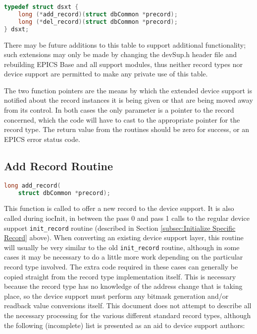 \begin{lstlisting}[language=C]
typedef struct dsxt {
    long (*add_record)(struct dbCommon *precord);
    long (*del_record)(struct dbCommon *precord);
} dsxt;
\end{lstlisting}

There may be future additions to this table to support additional functionality; such extensions may only be made by changing the devSup.h header file and rebuilding EPICS Base and all support modules, thus neither record types nor device support are permitted to make any private use of this table.

The two function pointers are the means by which the extended device support is notified about the record instances it is being given or that are being moved away from its control.
In both cases the only parameter is a pointer to the record concerned, which the code will have to cast to the appropriate pointer for the record type.
The return value from the routines should be zero for success, or an EPICS error status code.

\subsection{Add Record Routine}

\begin{lstlisting}[language=C]
long add_record(
    struct dbCommon *precord);
\end{lstlisting}

This function is called to offer a new record to the device support.
It is also called during iocInit, in between the pass 0 and pass 1 calls to the regular device support \verb|init_record| routine (described in Section \ref{subsec:Initialize Specific Record} above).
When converting an existing device support layer, this routine will usually be very similar to the old \verb|init_record| routine, although in some cases it may be necessary to do a little more work depending on the particular record type involved.
The extra code required in these cases can generally be copied straight from the record type implementation itself.
This is necessary because the record type has no knowledge of the address change that is taking place, so the device support must perform any bitmask generation and/or readback value conversions itself.
This document does not attempt to describe all the necessary processing for the various different standard record types, although the following (incomplete) list is presented as an aid to device support authors:

